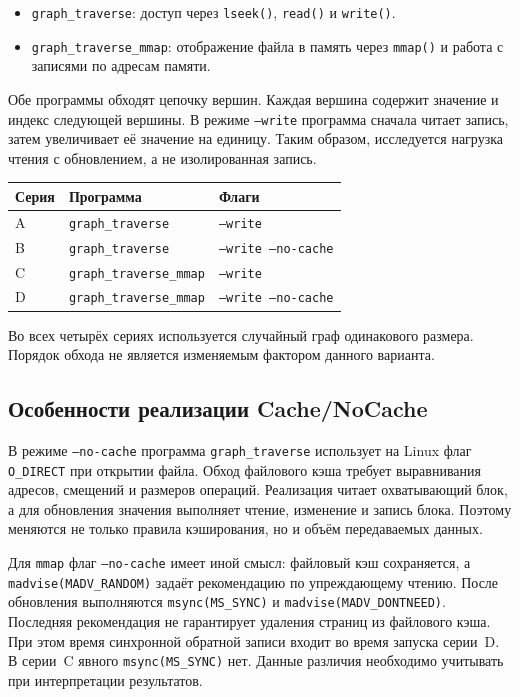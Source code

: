 \begin{itemize}
\item \texttt{graph\_traverse}: доступ через \texttt{lseek()},
\texttt{read()} и \texttt{write()}.
\item \texttt{graph\_traverse\_mmap}: отображение файла в память
через \texttt{mmap()} и работа с записями по адресам памяти.
\end{itemize}

Обе программы обходят цепочку вершин. Каждая вершина содержит значение
и индекс следующей вершины. В режиме \texttt{--write} программа сначала
читает запись, затем увеличивает её значение на единицу. Таким образом,
исследуется нагрузка чтения с обновлением, а не изолированная запись.

\begin{center}
\small
\begin{tabular}{|l|l|l|}
\hline
Серия & Программа & Флаги\\ \hline
A & \texttt{graph\_traverse} & \texttt{--write}\\ \hline
B & \texttt{graph\_traverse} & \texttt{--write --no-cache}\\ \hline
C & \texttt{graph\_traverse\_mmap} & \texttt{--write}\\ \hline
D & \texttt{graph\_traverse\_mmap} & \texttt{--write --no-cache}\\ \hline
\end{tabular}
\end{center}

Во всех четырёх сериях используется случайный граф одинакового размера.
Порядок обхода не является изменяемым фактором данного варианта.

\subsection{Особенности реализации Cache/NoCache}
В режиме \texttt{--no-cache} программа \texttt{graph\_traverse}
использует на Linux флаг \texttt{O\_DIRECT} при открытии файла.
Обход файлового кэша требует выравнивания адресов, смещений и размеров
операций. Реализация читает охватывающий блок, а для обновления значения
выполняет чтение, изменение и запись блока. Поэтому меняются не только
правила кэширования, но и объём передаваемых данных.

Для \texttt{mmap} флаг \texttt{--no-cache} имеет иной смысл:
файловый кэш сохраняется, а \texttt{madvise(MADV\_RANDOM)} задаёт
рекомендацию по упреждающему чтению. После обновления выполняются
\texttt{msync(MS\_SYNC)} и
\texttt{madvise(}\allowbreak\texttt{MADV\_DONTNEED)}.
Последняя рекомендация не гарантирует удаления страниц из файлового
кэша. При этом время синхронной обратной записи входит во время
запуска серии~D. В серии~C явного \texttt{msync(MS\_SYNC)} нет.
Данные различия необходимо учитывать при интерпретации результатов.

